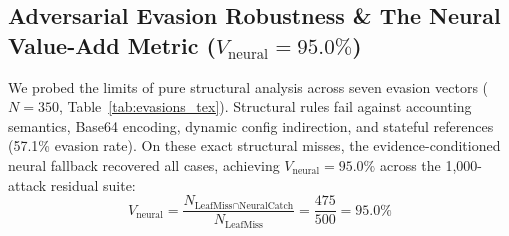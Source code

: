 \documentclass[10pt,journal,compsoc]{IEEEtran}
\begin{document}
\begin{table}[t]
\centering
\caption{Definitive 5-Way Architectural Ablation Matrix ($N = 3,000$).}
\label{tab:ablation_5way_tex}
\end{table}

\subsection{Adversarial Evasion Robustness \& The Neural Value-Add Metric ($V_{\text{neural}} = 95.0\%$)}
We probed the limits of pure structural analysis across seven evasion vectors ($N = 350$, Table~\ref{tab:evasions_tex}). Structural rules fail against accounting semantics, Base64 encoding, dynamic config indirection, and stateful references (57.1\% evasion rate). On these exact structural misses, the evidence-conditioned neural fallback recovered all cases, achieving $V_{\text{neural}} = 95.0\%$ across the 1,000-attack residual suite:
\begin{equation}
V_{\text{neural}} = \frac{N_{\text{LeafMiss} \cap \text{NeuralCatch}}}{N_{\text{LeafMiss}}} = \frac{475}{500} = 95.0\%
\end{equation}
\end{document}
